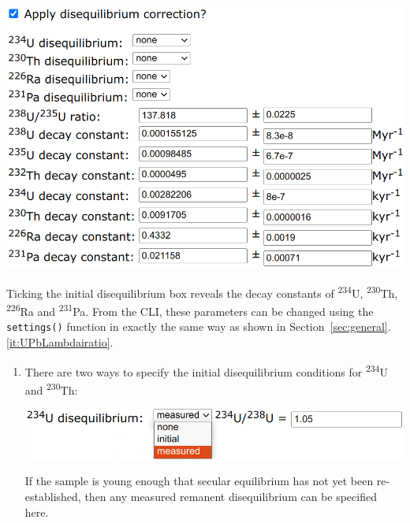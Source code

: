 \begin{refsection}
\begin{enumerate}
\noindent\begin{minipage}[t]{.6\linewidth}
  \strut\vspace*{-\baselineskip}\newline
  \includegraphics[width=\linewidth]{../figures/UPbDisequilibriumSettings.png}
  \end{minipage}
  \begin{minipage}[t]{.4\linewidth}
    Ticking the initial disequilibrium box reveals the decay constants
    of \textsuperscript{234}U, \textsuperscript{230}Th,
    \textsuperscript{226}Ra and \textsuperscript{231}Pa.  From the
    CLI, these parameters can be changed using the \texttt{settings()}
    function in exactly the same way as shown in
    Section~\ref{sec:general}.\ref{it:UPbLambdairatio}.
  \end{minipage}

\begin{enumerate}

\item There are two ways to specify the initial disequilibrium
  conditions for \textsuperscript{234}U and \textsuperscript{230}Th:
  
\noindent\begin{minipage}[t]{.6\linewidth}
  \strut\vspace*{-\baselineskip}\newline
  \includegraphics[width=\linewidth]{../figures/U234-disequilibrium.png}
  \end{minipage}
  \begin{minipage}[t]{.4\linewidth}
If the sample is young enough that secular equilibrium has not yet
been re-established, then any measured remanent disequilibrium can be
specified here.
  \end{minipage}


\end{enumerate}
\end{enumerate}
\end{refsection}
